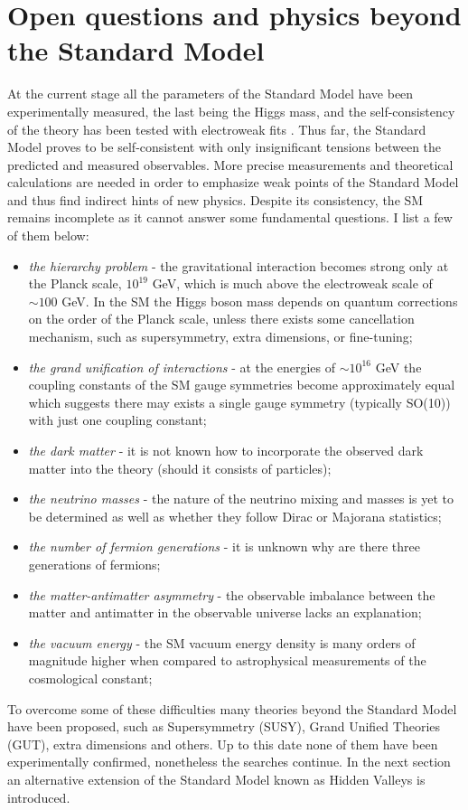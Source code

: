 \section{Open questions and physics beyond the Standard Model}

At the current stage all the parameters of the Standard Model have been experimentally measured,
the last being the Higgs mass, and the
self-consistency of the theory has been tested with electroweak fits \cite{Baak:2013ppa}.
Thus far, the Standard Model proves to be self-consistent with only insignificant tensions between
the predicted and measured observables. More precise measurements and theoretical calculations
are needed in order to emphasize weak points of the Standard Model and thus
find indirect hints of new physics.
Despite its consistency, the SM remains incomplete as it cannot answer some fundamental 
questions. I list a few of them below:
\begin{itemize}
 \item {\it the hierarchy problem} - the gravitational interaction becomes strong only at the 
Planck scale, $10^{19}$ GeV, which is much above the electroweak scale of $\sim 100$ GeV. 
In the SM the Higgs boson mass 
depends on quantum corrections on the order of the Planck scale, unless there
exists some cancellation mechanism, such as supersymmetry, extra dimensions, or fine-tuning; 
 \item {\it the grand unification of interactions} - at the energies of $\sim 10^{16}$ GeV
the coupling constants of the SM gauge symmetries become approximately equal which suggests
there may exists a single gauge symmetry (typically SO(10)) with just one coupling constant;
 \item {\it the dark matter} - it is not known how to incorporate the observed
 dark matter into the theory (should it consists of particles);
 \item {\it the neutrino masses} - the nature of the neutrino mixing and masses is yet to be
determined as well as whether they follow Dirac or Majorana statistics;
 \item {\it the number of fermion generations} - it is unknown why are there three generations
of fermions;
 \item {\it the matter-antimatter asymmetry} - the observable imbalance between the matter and
antimatter in the observable universe lacks an explanation;
 \item {\it the vacuum energy} - the SM vacuum
energy density is many orders of magnitude higher when compared to astrophysical measurements
of the cosmological constant;
\end{itemize}
To overcome some of these difficulties many theories beyond the Standard Model have been
proposed, such as Supersymmetry (SUSY), Grand Unified Theories (GUT), extra dimensions and others.
Up to this date none of them have been experimentally confirmed, nonetheless the searches continue.
In the next section an alternative extension of the Standard Model known as Hidden Valleys 
is introduced. 


